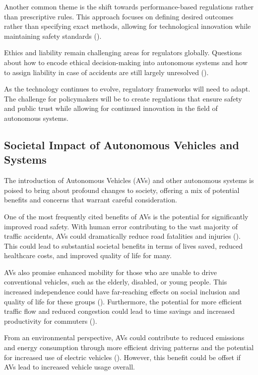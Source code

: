 Another common theme is the shift towards performance-based regulations rather than prescriptive rules. This approach focuses on defining desired outcomes rather than specifying exact methods, allowing for technological innovation while maintaining safety standards (\cite{Cihon2019}).

Ethics and liability remain challenging areas for regulators globally. Questions about how to encode ethical decision-making into autonomous systems and how to assign liability in case of accidents are still largely unresolved (\cite{Awad2018}).

As the technology continues to evolve, regulatory frameworks will need to adapt. The challenge for policymakers will be to create regulations that ensure safety and public trust while allowing for continued innovation in the field of autonomous systems.


\subsection{Societal Impact of Autonomous Vehicles and Systems}

The introduction of Autonomous Vehicles (AVs) and other autonomous systems is poised to bring about profound changes to society, offering a mix of potential benefits and concerns that warrant careful consideration.

One of the most frequently cited benefits of AVs is the potential for significantly improved road safety. With human error contributing to the vast majority of traffic accidents, AVs could dramatically reduce road fatalities and injuries (\cite{Fagnant2015}). This could lead to substantial societal benefits in terms of lives saved, reduced healthcare costs, and improved quality of life for many.

AVs also promise enhanced mobility for those who are unable to drive conventional vehicles, such as the elderly, disabled, or young people. This increased independence could have far-reaching effects on social inclusion and quality of life for these groups (\cite{Harper2016}). Furthermore, the potential for more efficient traffic flow and reduced congestion could lead to time savings and increased productivity for commuters (\cite{Wadud2016}).

From an environmental perspective, AVs could contribute to reduced emissions and energy consumption through more efficient driving patterns and the potential for increased use of electric vehicles (\cite{Greenblatt2015}). However, this benefit could be offset if AVs lead to increased vehicle usage overall.

